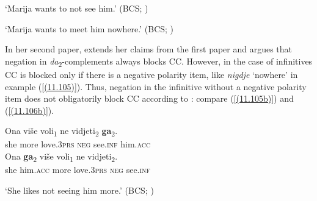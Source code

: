 \begin{exe}\ex
\begin{xlist}

\end{xlist}
\glt‘Marija wants to not see him.’
\hfill (BCS; \citealt[3]{Aljovic04})

\ex
\begin{xlist}
\end{xlist}
\glt ‘Marija wants to meet him nowhere.’
\hfill (BCS; \citealt[4]{Aljovic04})
\end{exe}

\noindent In her second paper, \citet[7]{Aljovic05} extends her claims from the first paper and argues that negation in \textit{da}\textsubscript{2}-complements always blocks CC. However, in the case of infinitives CC is blocked only if there is a negative polarity item, like \textit{nigdje} ‘nowhere’ in example (\ref{(11.105)}). Thus, negation in the infinitive without a negative polarity item does not obligatorily block CC according to \citet[7]{Aljovic05}: compare (\ref{(11.105b)}) and (\ref{(11.106b)}). 

\begin{exe}\ex\begin{xlist}
\ex\label{(11.106)}
\gll Ona više voli\textsubscript{1} ne vidjeti\textsubscript{2} \textbf{ga}\textsubscript{2}.\\
she more love.3\textsc{prs} \textsc{neg} see.\textsc{inf} him.\textsc{acc} \\
\ex\label{(11.106b)}
\gll Ona \textbf{ga}\textsubscript{2} više voli\textsubscript{1} ne vidjeti\textsubscript{2}. \\
she him.\textsc{acc} more love.3\textsc{prs} \textsc{neg} see.\textsc{inf} \\
\end{xlist}
\glt ‘She likes not seeing him more.’
\hfill (BCS; \citealt[7]{Aljovic05})
\end{exe}

